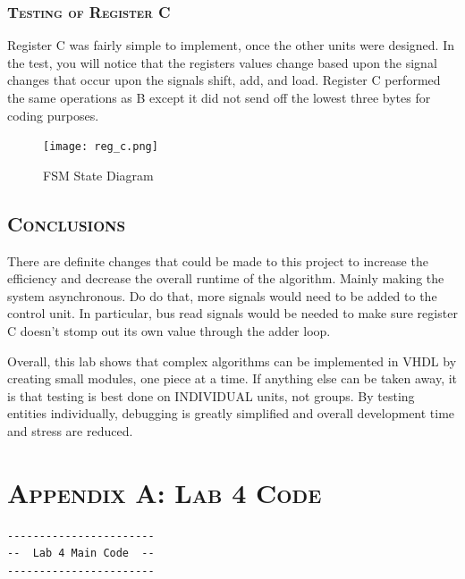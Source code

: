 \documentclass[11pt]{report}
\begin{document}
\begin{spacing}{1.5}
\subsection{\scshape Testing of Register C}
\label{sub:design_fsm}

Register C was fairly simple to implement, once the other units were designed.  In the test, you will notice that the registers values change based upon the signal changes that occur upon the signals shift, add, and load.  Register C performed the same operations as B except it did not send off the lowest three bytes for coding purposes.

\vspace{15px}
\begin{figure}[H]
    \centering
    \texttt{[image: reg\_c.png]}
    \caption{FSM State Diagram}
    \label{fig:diag_fsm}
\end{figure}

\clearpage

\section{\scshape Conclusions} %
\label{sec:conclusions}

There are definite changes that could be made to this project to increase the efficiency and decrease the overall runtime of the algorithm.  Mainly making the system asynchronous.  Do do that, more signals would need to be added to the control unit.  In particular, bus read signals would be needed to make sure register C doesn't stomp out its own value through the adder loop.

Overall, this lab shows that complex algorithms can be implemented in VHDL by creating small modules, one piece at a time.  If anything else can be taken away, it is that testing is best done on INDIVIDUAL units, not groups.  By testing entities individually, debugging is greatly simplified and overall development time and stress are reduced.



\clearpage

\chapter*{\scshape Appendix A: Lab 4 Code}
\label{app:a}

\vspace{15px}
\begin{lstlisting}
-----------------------
--  Lab 4 Main Code  --
-----------------------


\end{lstlisting}
\end{spacing}
\end{document}
